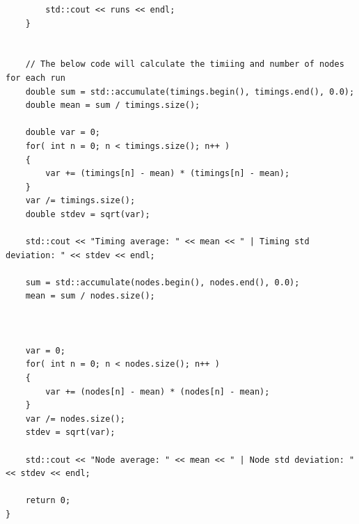 \documentclass{article}
\begin{document}
\begin{titlepage}
\begin{lstlisting}
        std::cout << runs << endl;
    }


    // The below code will calculate the timiing and number of nodes for each run
    double sum = std::accumulate(timings.begin(), timings.end(), 0.0);
    double mean = sum / timings.size();

    double var = 0;
    for( int n = 0; n < timings.size(); n++ )
    {
        var += (timings[n] - mean) * (timings[n] - mean);
    }
    var /= timings.size();
    double stdev = sqrt(var);

    std::cout << "Timing average: " << mean << " | Timing std deviation: " << stdev << endl;

    sum = std::accumulate(nodes.begin(), nodes.end(), 0.0);
    mean = sum / nodes.size();



    var = 0;
    for( int n = 0; n < nodes.size(); n++ )
    {
        var += (nodes[n] - mean) * (nodes[n] - mean);
    }
    var /= nodes.size();
    stdev = sqrt(var);

    std::cout << "Node average: " << mean << " | Node std deviation: " << stdev << endl;

    return 0;
}
\end{lstlisting}
\end{titlepage}
\end{document}
